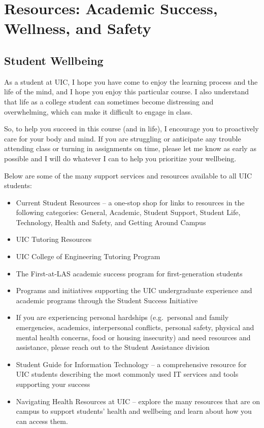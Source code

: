 \documentclass[11pt]{article}
\begin{document}
\section*{Resources: Academic Success, Wellness, and Safety}

\subsection*{Student Wellbeing}

As a student at UIC, I hope you have come to enjoy the learning process and the life of
the mind, and I hope you enjoy this particular course. I also understand that life as a
college student can sometimes become distressing and overwhelming, which can
make it difficult to engage in class.

So, to help you succeed in this course (and in life), I encourage you to proactively care
for your body and mind. If you are struggling or anticipate any trouble attending class
or turning in assignments on time, please let me know as early as possible and I will do
whatever I can to help you prioritize your wellbeing.

Below are some of the many support services and resources available to all UIC
students:

\begin{itemize}
  \item Current Student Resources -- a one-stop shop for links to resources in the
        following categories: General, Academic, Student Support, Student Life,
        Technology, Health and Safety, and Getting Around Campus
  \item UIC Tutoring Resources
  \item UIC College of Engineering Tutoring Program
  \item The First-at-LAS academic success program for first-generation students
  \item Programs and initiatives supporting the UIC undergraduate experience and
        academic programs through the Student Success Initiative
  \item If you are experiencing personal hardships (e.g.\ personal and family
        emergencies, academics, interpersonal conflicts, personal safety, physical and
        mental health concerns, food or housing insecurity) and need resources and
        assistance, please reach out to the Student Assistance division
  \item Student Guide for Information Technology -- a comprehensive resource for UIC
        students describing the most commonly used IT services and tools supporting
        your success
  \item Navigating Health Resources at UIC -- explore the many resources that are on
        campus to support students' health and wellbeing and learn about how you can
        access them.
\end{itemize}
\end{document}
